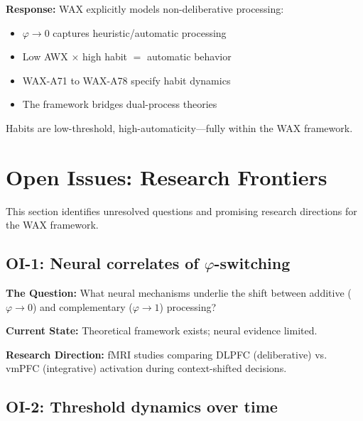 \textbf{Response:} WAX explicitly models non-deliberative processing:
\begin{itemize}[nosep]
    \item $\varphi \to 0$ captures heuristic/automatic processing
    \item Low AWX $\times$ high habit $=$ automatic behavior
    \item WAX-A71 to WAX-A78 specify habit dynamics
    \item The framework bridges dual-process theories
\end{itemize}
Habits are low-threshold, high-automaticity---fully within the WAX framework.


\section{Open Issues: Research Frontiers}
\label{sec:av-open-issues}

This section identifies unresolved questions and promising research directions for the WAX framework.

\subsection{OI-1: Neural correlates of $\varphi$-switching}

\textbf{The Question:} What neural mechanisms underlie the shift between additive ($\varphi \to 0$) and complementary ($\varphi \to 1$) processing?

\textbf{Current State:} Theoretical framework exists; neural evidence limited.

\textbf{Research Direction:} fMRI studies comparing DLPFC (deliberative) vs. vmPFC (integrative) activation during context-shifted decisions.

\subsection{OI-2: Threshold dynamics over time}

